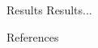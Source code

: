 \documentclass[final,hyperref={pdfpagelabels=false}]{beamer}
\begin{document}
\begin{frame}[t]
\begin{columns}[t]
  \begin{column}{.3\textwidth} %
    \begin{block}{Results}
        Results...


    \end{block}

    \begin{block}{References}
      \linespread{0.928}\selectfont
      \footnotesize{
      }
    \end{block}

  \end{column} %

  \begin{column}{.02\textwidth}\end{column} %

\end{columns} %

\end{frame} %
\end{document}
